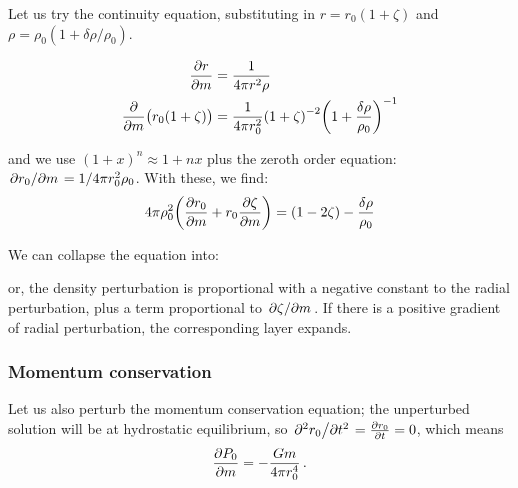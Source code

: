 \documentclass[main.tex]{subfiles}
\begin{document}
Let us try the continuity equation, substituting in \(r = r_0 (1+\zeta)\) and \(\rho = \rho_0 (1 + \delta \rho / \rho_0)\).

\begin{align}
  \pdv{r}{m} &= \frac{1}{4 \pi r^2 \rho }  \\
  \pdv{}{m} \qty(r_0 (1+\zeta)) &=
  \frac{1}{4 \pi r_0^2} \qty(1+\zeta)^{-2} \qty(1 + \frac{\delta \rho}{\rho_0})^{-1}
\end{align}

and we use \((1+x)^n \approx 1 + nx\) plus the zeroth order equation: \(\pdv*{r_0 }{m} = 1 / 4 \pi r_0^2 \rho_0\). 
With these, we find:
%
\begin{equation}
  4 \pi \rho_0^2 \qty(\pdv{r_0}{m} (1+\zeta) + r_0 \pdv{\zeta}{m})
  = (1-2 \zeta) -\frac{\delta \rho}{\rho_0}
\end{equation}

We can collapse the equation into:

or, the density perturbation is proportional with a negative constant to the radial perturbation, plus a term proportional to \(\pdv*{\zeta}{m}\).
If there is a positive gradient of radial perturbation, the corresponding layer expands.

\subsubsection{Momentum conservation}

Let us also perturb the momentum conservation equation; the unperturbed solution will be at hydrostatic equilibrium, so \(\pdv*[2]{r_0}{t} = \pdv{r_0 }{t} =0 \), which means 
%
\begin{align} \label{eq:hydrostatic-equilibrium}
\pdv{P_0 }{m} = - \frac{Gm}{4 \pi r_0^{4}}
\,.
\end{align}
\end{document}
